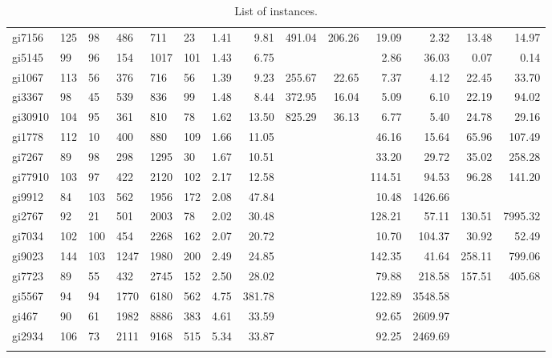 {\begin{longtable}{l lllll rrrr rrrr }
gi7156 & 125 & 98 & 486 & 711 & 23 & 1.41 & 9.81 & 491.04 & 206.26 & 19.09 & 2.32 & 13.48 & 14.97 \\
gi5145 & 99 & 96 & 154 & 1017 & 101 & 1.43 & 6.75 &  &  & 2.86 & 36.03 & 0.07 & 0.14 \\
gi1067 & 113 & 56 & 376 & 716 & 56 & 1.39 & 9.23 & 255.67 & 22.65 & 7.37 & 4.12 & 22.45 & 33.70 \\
gi3367 & 98 & 45 & 539 & 836 & 99 & 1.48 & 8.44 & 372.95 & 16.04 & 5.09 & 6.10 & 22.19 & 94.02 \\
gi30910 & 104 & 95 & 361 & 810 & 78 & 1.62 & 13.50 & 825.29 & 36.13 & 6.77 & 5.40 & 24.78 & 29.16 \\
gi1778 & 112 & 10 & 400 & 880 & 109 & 1.66 & 11.05 &  &  & 46.16 & 15.64 & 65.96 & 107.49 \\
gi7267 & 89 & 98 & 298 & 1295 & 30 & 1.67 & 10.51 &  &  & 33.20 & 29.72 & 35.02 & 258.28 \\
gi77910 & 103 & 97 & 422 & 2120 & 102 & 2.17 & 12.58 &  &  & 114.51 & 94.53 & 96.28 & 141.20 \\
gi9912 & 84 & 103 & 562 & 1956 & 172 & 2.08 & 47.84 &  &  & 10.48 & 1426.66 &  &  \\
gi2767 & 92 & 21 & 501 & 2003 & 78 & 2.02 & 30.48 &  &  & 128.21 & 57.11 & 130.51 & 7995.32 \\
gi7034 & 102 & 100 & 454 & 2268 & 162 & 2.07 & 20.72 &  &  & 10.70 & 104.37 & 30.92 & 52.49 \\
gi9023 & 144 & 103 & 1247 & 1980 & 200 & 2.49 & 24.85 &  &  & 142.35 & 41.64 & 258.11 & 799.06 \\
gi7723 & 89 & 55 & 432 & 2745 & 152 & 2.50 & 28.02 &  &  & 79.88 & 218.58 & 157.51 & 405.68 \\
gi5567 & 94 & 94 & 1770 & 6180 & 562 & 4.75 & 381.78 &  &  & 122.89 & 3548.58 &  &  \\
gi467 & 90 & 61 & 1982 & 8886 & 383 & 4.61 & 33.59 &  &  & 92.65 & 2609.97 &  &  \\
gi2934 & 106 & 73 & 2111 & 9168 & 515 & 5.34 & 33.87 &  &  & 92.25 & 2469.69 &  &  \\
\caption{List of instances.}
\label{appendix:tab:instances}
\end{longtable}
}